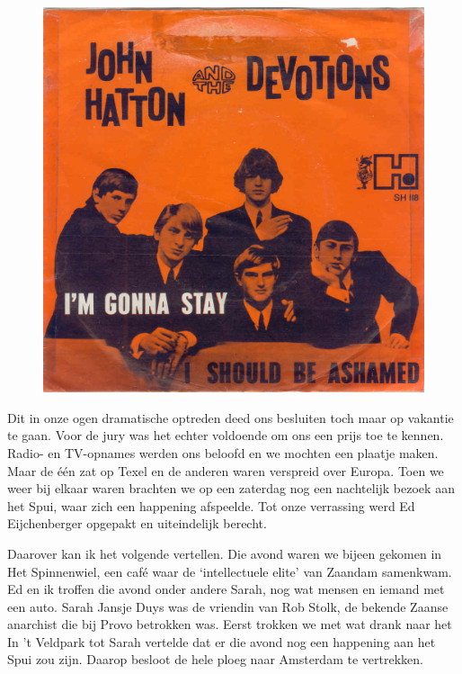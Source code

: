 \documentclass[12pt,twoside, openright]{memoir}
\begin{document}
\begin{figure}
\centering
\includegraphics[width=\textwidth]{img/4-devotions3}
\end{figure}

Dit in onze ogen dramatische optreden deed ons besluiten toch maar op vakantie te gaan. Voor de jury was het echter voldoende om ons een prijs toe te kennen. Radio- en TV-opnames werden ons beloofd en we mochten een plaatje maken. Maar de één zat op Texel en de anderen waren verspreid over Europa. Toen we weer bij elkaar waren brachten we op een zaterdag nog een nachtelijk bezoek aan het Spui, waar zich een happening afspeelde. Tot onze verrassing werd Ed Eijchenberger opgepakt en uiteindelijk berecht.

Daarover kan ik het volgende vertellen. Die avond waren we bijeen gekomen in Het Spinnenwiel, een café waar de `intellectuele elite' van Zaandam samenkwam. Ed en ik troffen die avond onder andere Sarah, nog wat mensen en iemand met een auto. Sarah Jansje Duys was de vriendin van Rob Stolk, de bekende Zaanse anarchist die bij Provo betrokken was. Eerst trokken we met wat drank naar het In ’t Veldpark tot Sarah vertelde dat er die avond nog een happening aan het Spui zou zijn. Daarop besloot de hele ploeg naar Amsterdam te vertrekken. 
\end{document}
